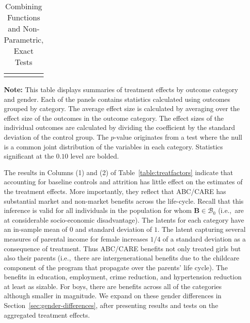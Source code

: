 \begin{table}[!htpb]
\begin{threeparttable}
\caption{Combining Functions and Non-Parametric, Exact Tests} \label{table:massiveall}
\centering
\begin{tabularx}{16.75cm}{XcX}
&  & 
\end{tabularx}
\begin{tablenotes}
\footnotesize
\item \textbf{Note:} This table displays summaries of treatment effects by outcome category and gender. Each of the panels contains statistics calculated using outcomes grouped by category. The average effect size is calculated by averaging over the effect size of the outcomes in the outcome category. The effect sizes of the individual outcomes are calculated by dividing the coefficient by the standard deviation of the control group.  The \citet{Rosenbaum_2005_Distribution_JRSS} $p$-value originates from a test where the null is a common joint distribution of the variables in each category. Statistics significant at the $0.10$ level are bolded.
\end{tablenotes}
\end{threeparttable}
\end{table}


The results in  Columns (1) and (2) of Table~\ref{table:treatfactors} indicate that accounting for baseline controls and attrition has little effect on the estimates of the treatment effects. More importantly, they reflect that ABC/CARE has substantial market and non-market benefits across the life-cycle. Recall that this inference is valid for all individuals in the population for whom $\bm{B} \in \mathcal{B}_0$ (i.e.,\ are at considerable socio-economic disadvantage). The latents for each category have an in-sample mean of $0$ and standard deviation of $1$. The latent capturing several measures of parental income for female increases $1/4$ of a standard deviation as a consequence of treatment. Thus ABC/CARE benefits not only treated girls but also their parents (i.e.,\ there are intergenerational benefits due to the childcare component of the program that propagate over the parents' life cycle). The benefits in education, employment, crime reduction, and hypertension reduction at least as sizable. For boys, there are benefits across all of the categories although smaller in magnitude. We expand on these gender differences in Section~\ref{sec:gender-differences}, after presenting results and tests on the aggregated treatment effects.

